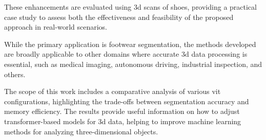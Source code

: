 These enhancements are evaluated using \gls{3d} scans of shoes, providing a practical case study to assess both the effectiveness and feasibility of the proposed approach in real-world scenarios.

\medskip

While the primary application is footwear segmentation, the methods developed are broadly applicable to other domains where accurate \gls{3d} data processing is essential, such as medical imaging, autonomous driving, industrial inspection, and others.

\medskip

The scope of this work includes a comparative analysis of various \gls{vit} configurations, highlighting the trade-offs between segmentation accuracy and memory efficiency. The results provide useful information on how to adjust transformer-based models for \gls{3d} data, helping to improve machine learning methods for analyzing three-dimensional objects.


